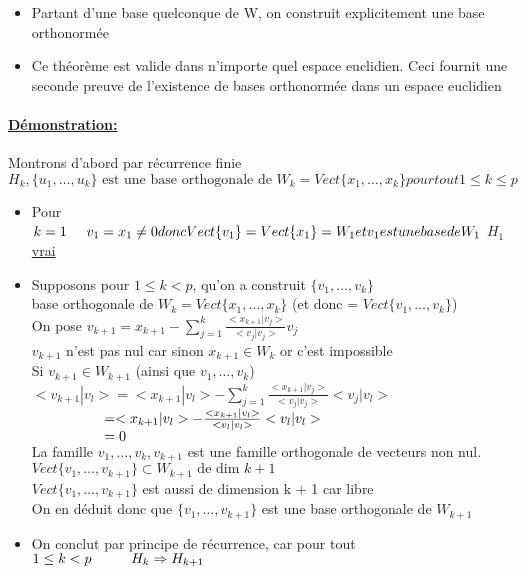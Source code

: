 \documentclass{article}
\newcommand\tab[1][1cm]{\hspace*{#1}}
\begin{document}
\begin{itemize}
    \item Partant d'une base quelconque de W, on construit explicitement une base orthonormée
    \item Ce théorème est valide dans n'importe quel espace euclidien. Ceci fournit une seconde preuve de l'existence de bases orthonormée dans un espace euclidien
\end{itemize}

\paragraph{\underline{Démonstration:}} Montrons d'abord par récurrence finie\\
$H_k, \{u_1, \dots, u_k\} \mbox{ est une base orthogonale de } W_k = Vect\{x_1, \dots, x_k\} pour tout 1 \leq k \leq p$

\begin{itemize}
    \item Pour $k = 1 \tab[0.5cm] v_1 = x_1 \neq 0 donc Vect\{v_1\} = Vect\{x_1\} = W_1 et v_1 est une base de W_1$ \tab[0.5cm] \underline{$H_1$ vrai}
    \item Supposons pour $1 \leq k < p$, qu'on a construit $\{v_1, \dots, v_k\}$ \\ base orthogonale de $W_k = Vect\{x_1, \dots, x_k\}$ (et donc = $Vect\{v_1, \dots, v_k\}$)\\
On pose $v_{k+1} = x_{k + 1} - \sum_{j=1}^k \frac{<x_{k+1} | v_j>}{<v_j | v_j>}v_j$ \\
$v_{k+1}$ n'est pas nul car sinon $x_{k+1} \in W_k$ or c'est impossible\\
Si $v_{k+1} \in W_{k+1}$ (ainsi que $v_1, \dots, v_k$)\\
$<v_{k+1} | v_l> = <x_{k+1} | v_l> - \sum_{j = 1}^k \frac{<x_{k+1} | v_j>}{<v_j | v_j>}<v_j | v_l>$\\
$\tab[1.8cm] = <x_{k+1} | v_l> - \frac{<x_{k+1} | v_l>}{<v_l | v_l>}<v_l|v_l>$\\
$\tab[1.8cm] = 0$\\
La famille ${v_1, \dots, v_k, v_{k+1}}$ est une famille orthogonale de vecteurs non nul. \\
$Vect\{v_1, \dots, v_{k+1}\} \subset W_{k+1} \mbox{ de dim } k + 1$ \\
$Vect\{v_1, \dots, v_{k+1}\}$ est aussi de dimension k + 1 car libre\\

On en déduit donc que $\{v_1, \dots, v_{k+1}\}$ est une base orthogonale de $W_{k+1}$

\item On conclut par principe de récurrence, car pour tout $1 \leq k < p \tab H_k \Rightarrow H_{k+1}$
\end{itemize}
\end{document}
